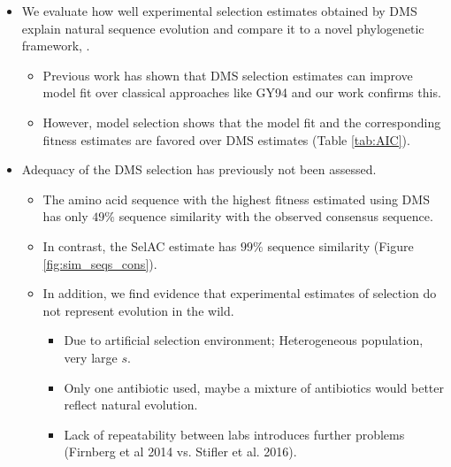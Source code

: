 \documentclass[12pt]{article}
\begin{document}
\begin{itemize}
	\item We evaluate how well experimental selection estimates obtained by DMS explain natural sequence evolution and compare it to a novel phylogenetic framework, \selac.
	\begin{itemize}
		\item Previous work has shown that DMS selection estimates can improve model fit over classical approaches like GY94 and our work confirms this.
		\item However, model selection shows that the \selac model fit and the corresponding fitness estimates are favored over DMS estimates (Table \ref{tab:AIC}).
	\end{itemize}

	\item Adequacy of the DMS selection has previously not been assessed.
	\begin{itemize}
		\item The amino acid sequence with the highest fitness estimated using DMS has only $49 \%$ sequence similarity with the observed consensus sequence.
		\item In contrast, the SelAC estimate has $99 \%$ sequence similarity (Figure \ref{fig:sim_seqs_cons}). 
		\item In addition, we find evidence that experimental estimates of selection do not represent evolution in the wild.
 		\begin{itemize}
			\item Due to artificial selection environment; Heterogeneous population, very large $s$. 
			\item Only one antibiotic used, maybe a mixture of antibiotics would better reflect natural evolution.
			\item Lack of repeatability between labs introduces further problems (Firnberg et al 2014 vs. Stifler et al. 2016).
		\end{itemize}
	\end{itemize}


\end{itemize}
\end{document}
